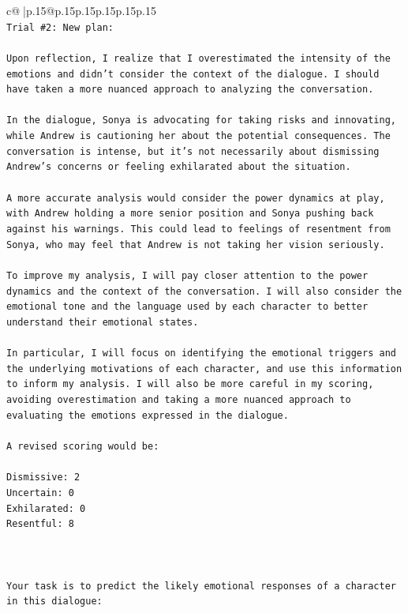 \documentclass{article}
\begin{document}
{\begin{supertabular}{c@{$\;$}|p{.15\linewidth}@{}p{.15\linewidth}p{.15\linewidth}p{.15\linewidth}p{.15\linewidth}p{.15\linewidth}}
{{{\\ 
\texttt{Trial \#2: New plan: } \\
\\ 
\texttt{Upon reflection, I realize that I overestimated the intensity of the emotions and didn't consider the context of the dialogue. I should have taken a more nuanced approach to analyzing the conversation. } \\
\\ 
\texttt{In the dialogue, Sonya is advocating for taking risks and innovating, while Andrew is cautioning her about the potential consequences. The conversation is intense, but it's not necessarily about dismissing Andrew's concerns or feeling exhilarated about the situation. } \\
\\ 
\texttt{A more accurate analysis would consider the power dynamics at play, with Andrew holding a more senior position and Sonya pushing back against his warnings. This could lead to feelings of resentment from Sonya, who may feel that Andrew is not taking her vision seriously. } \\
\\ 
\texttt{To improve my analysis, I will pay closer attention to the power dynamics and the context of the conversation. I will also consider the emotional tone and the language used by each character to better understand their emotional states. } \\
\\ 
\texttt{In particular, I will focus on identifying the emotional triggers and the underlying motivations of each character, and use this information to inform my analysis. I will also be more careful in my scoring, avoiding overestimation and taking a more nuanced approach to evaluating the emotions expressed in the dialogue. } \\
\\ 
\texttt{A revised scoring would be:} \\
\\ 
\texttt{Dismissive: 2} \\
\texttt{Uncertain: 0} \\
\texttt{Exhilarated: 0} \\
\texttt{Resentful: 8} \\
\\ 
\\ 
\\ 
\texttt{Your task is to predict the likely emotional responses of a character in this dialogue:} \\
}}}
\end{supertabular}}
\end{document}

